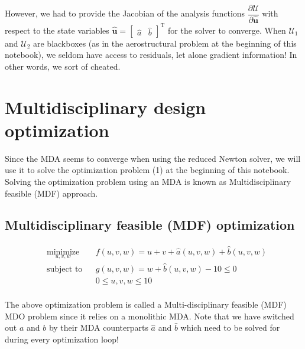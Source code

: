 \documentclass[11pt]{article}
\begin{document}
However, we had to provide the Jacobian of the analysis functions
\(\dfrac{\partial\mathcal{U}}{\partial\hat{\mathbf{u}}}\) with respect
to the state variables
\(\hat{\mathbf{u}} = \begin{bmatrix} \hat{a} & \hat{b} \end{bmatrix}^\mathrm{T}\)
for the solver to converge. When \(\mathcal{U}_1\) and \(\mathcal{U}_2\)
are blackboxes (as in the aerostructural problem at the beginning of
this notebook), we seldom have access to residuals, let alone gradient
information! In other words, we sort of cheated.

    \hypertarget{multidisciplinary-design-optimization}{%
\section{Multidisciplinary design
optimization}\label{multidisciplinary-design-optimization}}

Since the MDA seems to converge when using the reduced Newton solver, we
will use it to solve the optimization problem (1) at the beginning of
this notebook. Solving the optimization problem using an MDA is known as
Multidisciplinary feasible (MDF) approach.

\hypertarget{multidisciplinary-feasible-mdf-optimization}{%
\subsection{Multidisciplinary feasible (MDF)
optimization}\label{multidisciplinary-feasible-mdf-optimization}}

\begin{equation*}
    \begin{aligned}
        & \underset{u,v,w}{\text{minimize}}
        & & f(u,v,w) = u+v+\hat{a}(u,v,w)+\hat{b}(u,v,w)\\
        & \text{subject to}
        & & g(u,v,w) = w + \hat{b}(u,v,w) -10 \leq 0\\
        & & & 0 \leq u,v,w \leq 10\\
    \end{aligned}
    \tag{5}
\end{equation*}

The above optimization problem is called a Multi-disciplinary feasible
(MDF) MDO problem since it relies on a monolithic MDA. Note that we have
switched out \(a\) and \(b\) by their MDA counterparts \(\hat{a}\) and
\(\hat{b}\) which need to be solved for during every optimization loop!
\end{document}
